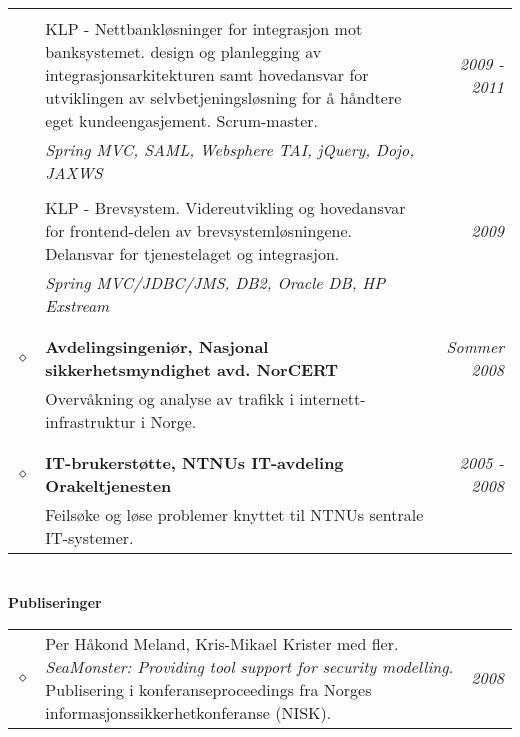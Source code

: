 \documentclass[overlapped,line,letterpaper]{res}
\begin{document}
\begin{resume}
\begin{tabularx}{\textwidth}{lXr}
      &&\\
      & KLP - Nettbankløsninger for integrasjon mot banksystemet. design og planlegging
      av integrasjonsarkitekturen samt hovedansvar for
      utviklingen av selvbetjeningsløsning for å håndtere eget kundeengasjement. Scrum-master. & \textit{2009 - 2011} \\
      & \small \textit{Spring MVC, SAML, Websphere TAI, jQuery, Dojo, JAXWS} & \\
      &&\\
      & KLP - Brevsystem. Videreutvikling og hovedansvar for frontend-delen
      av brevsystemløsningene. Delansvar for tjenestelaget og integrasjon. & \textit{2009} \\
      & \small \textit{Spring MVC/JDBC/JMS, DB2, Oracle DB, HP Exstream} & \\

&&\\
&&\\

   $\diamond$	& \textbf{Avdelingsingeniør, Nasjonal sikkerhetsmyndighet avd. NorCERT} 	& \textit{Sommer 2008}\\
			& Overvåkning og analyse av trafikk i internett-infrastruktur i Norge.										& \\

&&\\
&&\\
$\diamond$	& \textbf{IT-brukerstøtte, NTNUs IT-avdeling Orakeltjenesten} 	& \textit{2005 - 2008}\\
			& Feilsøke og løse problemer knyttet til NTNUs sentrale IT-systemer.			& \\

\end{tabularx}

\clearpage

\section{}
\textbf{Publiseringer}\\
\makebox[\textwidth]{\hrulefill}

\begin{tabularx}{\textwidth}{lXr}

$\diamond$	& Per Håkond Meland, Kris-Mikael Krister med fler.
\emph{SeaMonster: Providing tool support for security modelling}.
Publisering i konferanseproceedings fra Norges
informasjons\-sikkerhetkonferanse (NISK).  & \textit{2008}\\


\end{tabularx}
\end{resume}
\end{document}
